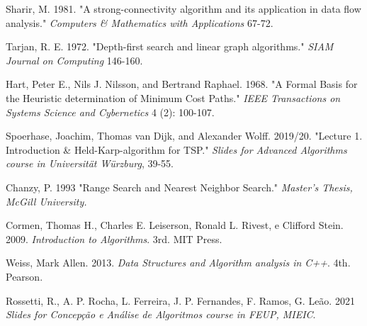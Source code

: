 \documentclass[12pt,a4paper]{report}
\begin{document}
\begin{thebibliography}{9}

	Sharir, M. 1981.
	"A strong-connectivity algorithm and its application in data flow analysis."
	\textit{Computers \& Mathematics with Applications} 67-72.

	Tarjan, R. E. 1972.
	"Depth-first search and linear graph algorithms."
	\textit{SIAM Journal on Computing} 146-160.

	Hart, Peter E., Nils J. Nilsson, and Bertrand Raphael. 1968. 
	"A Formal Basis for the Heuristic determination of Minimum Cost Paths." 
	\textit{IEEE Transactions on Systems Science and Cybernetics} 4 (2): 100-107.

	Spoerhase, Joachim, Thomas van Dijk, and Alexander Wolff. 2019/20.
	"Lecture 1. Introduction \& Held-Karp-algorithm for TSP."
	\textit{Slides for Advanced Algorithms course in Universität Würzburg}, 39-55.
	
	Chanzy, P. 1993
	"Range Search and Nearest Neighbor Search."
	\textit{Master’s Thesis, McGill University.}

	Cormen, Thomas H., Charles E. Leiserson, Ronald L. Rivest, e Clifford Stein. 2009.
	\textit{Introduction to Algorithms}. 3rd. MIT Press.

	Weiss, Mark Allen. 2013.
	\textit{Data Structures and Algorithm analysis in C++}. 4th. Pearson.

	Rossetti, R., A. P. Rocha, L. Ferreira, J. P. Fernandes, F. Ramos, G. Leão. 2021
	\textit{Slides for Concepção e Análise de Algoritmos course in FEUP, MIEIC}.

\end{thebibliography}
\end{document}
